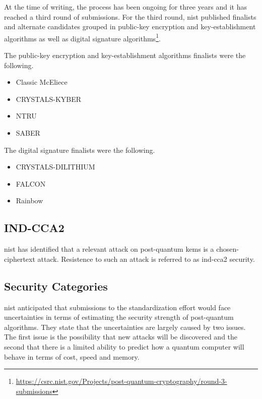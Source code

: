 At the time of writing, the process has been ongoing for three years and it has reached a third round of submissions. For the third round, \gls{nist} published finalists and alternate candidates grouped in public-key encryption and key-establishment algorithms as well as digital signature algorithms\footnote{\href{https://csrc.nist.gov/Projects/post-quantum-cryptography/round-3-submissions}{https://csrc.nist.gov/Projects/post-quantum-cryptography/round-3-submissions}}.

The public-key encryption and key-establishment algorithms finalists were the following.

\begin{itemize}
    \item Classic McEliece
    \item CRYSTALS-KYBER
    \item NTRU
    \item SABER
\end{itemize}

The digital signature finalists were the following.

\begin{itemize}
    \item CRYSTALS-DILITHIUM
    \item FALCON
    \item Rainbow
\end{itemize}

\subsection{IND-CCA2}

\gls{nist} has identified that a relevant attack on post-quantum \glspl{kem} is a chosen-ciphertext attack. Resistence to such an attack is referred to as \gls{ind-cca2} security\cite{nist2017}. 


\subsection{Security Categories}

\gls{nist} anticipated that submissions to the standardization effort would face uncertainties in terms of estimating the security strength of post-quantum algorithms. They state that the uncertainties are largely caused by two issues. The first issue is the possibility that new attacks will be discovered and the second that there is a limited ability to predict how a quantum computer will behave in terms of cost, speed and memory\cite{nist2017}.

